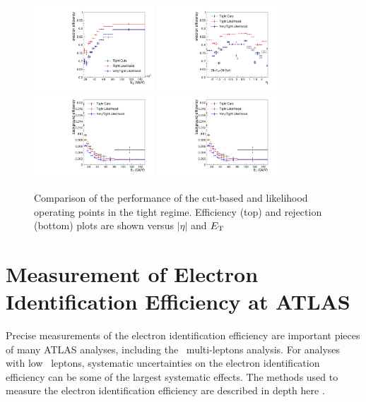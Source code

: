 \begin{figure}[!t]
\centering 
\includegraphics[width=0.40\textwidth]{figs/electron/tight_eff_et}
\includegraphics[width=0.40\textwidth]{figs/electron/tight_eff_eta}
\includegraphics[width=0.40\textwidth]{figs/electron/tight_bkg_et}
\includegraphics[width=0.40\textwidth]{figs/electron/tight_bkg_et}
\caption{Comparison of the performance of the cut-based and likelihood operating points in the tight regime. Efficiency (top) and rejection (bottom) plots are shown versus $|\eta|$ and $E_{\mathrm{T}}$}
\label{figure:electron_cutvslh}
\end{figure}

\section{Measurement of Electron Identification Efficiency at ATLAS}

Precise measurements of the electron identification efficiency are important pieces of many ATLAS analyses, including the \tth\ multi-leptons analysis. For analyses with low \pt\ leptons, systematic uncertainties on the electron identification efficiency can be some of the largest systematic effects. The methods used to measure the electron identification efficiency are described in depth here \cite{ATLAS-CONF-2014-032}. 

